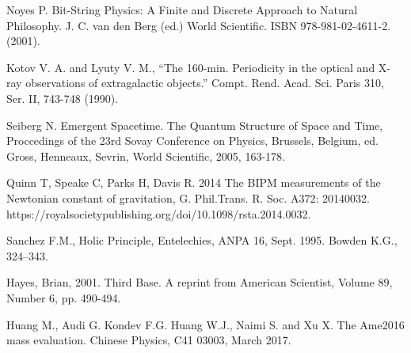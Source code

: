 \documentclass[a4paper,9pt]{article}
\begin{document}
\begin{thebibliography}{99}
 Noyes P. Bit-String Physics: A Finite and Discrete Approach to Natural Philosophy. J. C. van den Berg (ed.) World Scientific. ISBN 978-981-02-4611-2. (2001).













 Kotov V. A. and Lyuty V. M., “The 160-min. Periodicity in the optical and X-ray observations of extragalactic objects.” Compt. Rend. Acad. Sci. Paris 310, Ser. II, 743-748 (1990).


 Seiberg N. Emergent Spacetime. The Quantum Structure of Space and Time, Proccedings of the 23rd Sovay Conference on Physics, Brussels, Belgium, ed. Gross, Henneaux, Sevrin, World Scientific, 2005, 163-178.


 Quinn T, Speake C, Parks H, Davis R. 2014 The BIPM measurements of the Newtonian constant of gravitation, G. Phil.Trans. R. Soc. A372: 20140032. https://royalsocietypublishing.org/doi/10.1098/rsta.2014.0032.

 Sanchez F.M., Holic Principle, Entelechies, ANPA 16, Sept. 1995. Bowden K.G., 324--343.

 Hayes, Brian, 2001. Third Base. A reprint from American Scientist, Volume 89, Number 6, pp. 490-494. 


 Huang M., Audi G. Kondev F.G. Huang W.J., Naimi S. and Xu X. The Ame2016 mass evaluation. Chinese Physics, C41 03003, March 2017.


\end{thebibliography}
\end{document}
